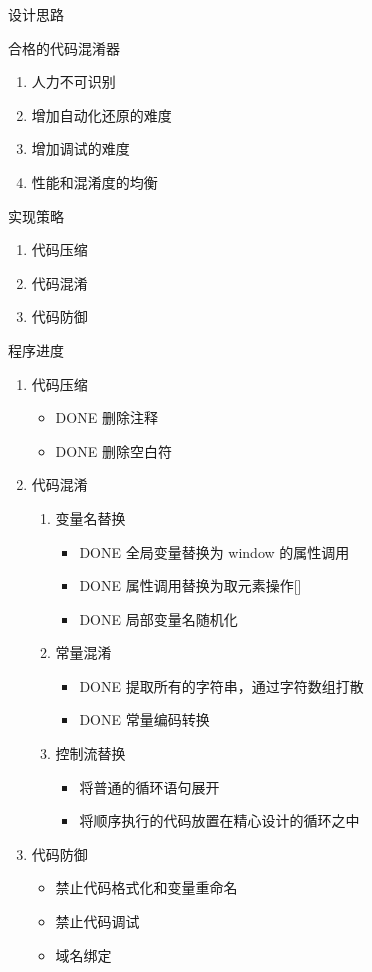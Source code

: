 \documentclass[presentation]{beamer}
\begin{document}
\begin{frame}[label=sec-4]{设计思路}
\begin{block}{合格的代码混淆器}
\begin{enumerate}
\item 人力不可识别
\item 增加自动化还原的难度
\item 增加调试的难度
\item 性能和混淆度的均衡
\end{enumerate}
\end{block}
\begin{block}{实现策略}
\begin{enumerate}
\item 代码压缩
\item 代码混淆
\item 代码防御
\end{enumerate}
\end{block}
\end{frame}
\begin{frame}[label=sec-5]{程序进度}
\begin{enumerate}
\item 代码压缩
\begin{itemize}
\item \alert{DONE} 删除注释
\item \alert{DONE} 删除空白符
\end{itemize}
\item 代码混淆
\begin{enumerate}
\item 变量名替换
\begin{itemize}
\item \alert{DONE} 全局变量替换为 window 的属性调用
\item \alert{DONE} 属性调用替换为取元素操作[]
\item \alert{DONE} 局部变量名随机化
\end{itemize}
\item 常量混淆
\begin{itemize}
\item \alert{DONE} 提取所有的字符串，通过字符数组打散
\item \alert{DONE} 常量编码转换
\end{itemize}
\item 控制流替换
\begin{itemize}
\item \color{red}{TODO} 将普通的循环语句展开
\item \color{red}{TODO} 将顺序执行的代码放置在精心设计的循环之中
\end{itemize}
\end{enumerate}
\item 代码防御
\begin{itemize}
\item \color{red}{TODO} 禁止代码格式化和变量重命名
\item \color{red}{TODO} 禁止代码调试
\item \color{red}{TODO} 域名绑定
\end{itemize}
\end{enumerate}
\end{frame}
\end{document}
